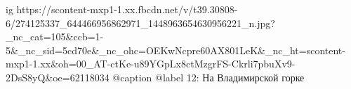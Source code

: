  
 
 
 
 

\ifcmt
  ig https://scontent-mxp1-1.xx.fbcdn.net/v/t39.30808-6/274125337_644466956862971_1448963654630956221_n.jpg?_nc_cat=105&ccb=1-5&_nc_sid=5cd70e&_nc_ohc=OEKwNcpre60AX801LeK&_nc_ht=scontent-mxp1-1.xx&oh=00_AT-ctKe-u89YGpLx8ctMzgrFS-Ckrli7pbuXv9-2DsS8yQ&oe=62118034
  @caption @label 12: На Владимирской горке
\fi
